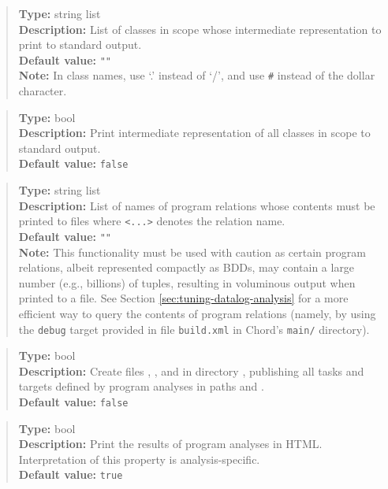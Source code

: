 \begin{quote}
{\bf Type:} string list  \\
{\bf Description:} List of classes in scope whose intermediate representation to print to standard output. \\
{\bf Default value:} {\tt ""} \\
{\bf Note:} In class names, use `.' instead of `/', and use {\tt \#} instead of the dollar character. 
\end{quote}

\begin{quote}
{\bf Type:} bool \\
{\bf Description:} Print intermediate representation of all classes in scope to standard output. \\
{\bf Default value:} {\tt false}
\end{quote}

\begin{quote}
{\bf Type:} string list  \\
{\bf Description:} List of names of program relations whose contents must be printed to files  where {\tt <...>} denotes the relation name. \\
{\bf Default value:} {\tt ""} \\
{\bf Note:} This functionality must be used with caution as certain program relations, albeit represented compactly as BDDs, may contain a large number (e.g., billions) of tuples, resulting in voluminous output when printed to a file.  See Section \ref{sec:tuning-datalog-analysis} for a more efficient way to query the contents of program relations (namely, by using the {\tt debug} target provided in file {\tt build.xml} in Chord's {\tt main/} directory). 
\end{quote}

\begin{quote}
{\bf Type:} bool \\
{\bf Description:} Create files , , and  in directory , publishing all tasks and targets defined by program analyses in paths  and .  \\
{\bf Default value:} {\tt false}
\end{quote}

\begin{quote}
{\bf Type:} bool \\
{\bf Description:} Print the results of program analyses in HTML.  Interpretation of this property is analysis-specific.  \\
{\bf Default value:} {\tt true}
\end{quote}

